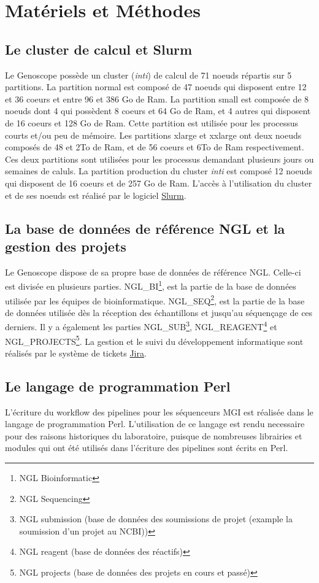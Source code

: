 \section{Matériels et Méthodes}
\subsection{Le cluster de calcul et Slurm}
Le Genoscope possède un cluster (\emph{inti}) de calcul de 71 noeuds répartis sur 5 partitions. La partition \og normal\fg{} est composé de 47 noeuds qui disposent entre 12 et 36 coeurs et entre 96 et 386 Go de Ram. La partition \og small\fg{} est composée de 8 noeuds dont 4 qui possèdent 8 coeurs et 64 Go de Ram, et 4 autres qui disposent de 16 coeurs et 128 Go de Ram. Cette partition est utilisée pour les processus courts et/ou peu de mémoire. Les partitions \og xlarge \fg{} et \og xxlarge\fg{} ont deux noeuds composés de 48 et 2To de Ram, et de 56 coeurs et 6To de Ram respectivement. Ces deux partitions sont utilisées pour les processus demandant plusieurs jours ou semaines de caluls.
La partition \og production\fg{} du cluster \emph{inti} est composé 12 noeuds qui disposent de 16 coeurs et de 257 Go de Ram.
L'accès à l'utilisation du cluster et de ses noeuds est réalisé par le logiciel \href{https://slurm.schedmd.com/documentation.html}{Slurm}.

\subsection{La base de données de référence NGL et la gestion des projets}
Le Genoscope dispose de sa propre base de données de référence NGL. Celle-ci est divisée en plusieurs parties. NGL\_BI\footnote{NGL Bioinformatic}, est la partie de la base de données utilisée par les équipes de bioinformatique. NGL\_SEQ\footnote{NGL Sequencing}, est la partie de la base de données utilisée dès la réception des échantillons et jusqu'au séquençage de ces derniers. Il y a également les parties NGL\_SUB\footnote{NGL submission (base de données des soumissions de projet (example la soumission d'un projet au NCBI))}, NGL\_REAGENT\footnote{NGL reagent (base de données des réactifs)} et NGL\_PROJECTS\footnote{NGL projects (base de données des projets en cours et passé)}. La gestion et le suivi du développement informatique sont réalisés par le système de tickets \href{https://www.atlassian.com/fr/software/jira}{Jira}.

\subsection{Le langage de programmation Perl}
L'écriture du workflow des pipelines pour les séquenceurs MGI est réalisée dans le langage de programmation Perl. L'utilisation de ce langage est rendu necessaire pour des raisons historiques du laboratoire, puisque de nombreuses librairies et modules qui ont été utilisés dans l'écriture des pipelines sont écrits en Perl.\\

